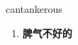 
\begin{frame}
{\huge cantankerous}
\begin{center}
\begin{enumerate}\Large
  \item \textbf{脾气不好的}
\end{enumerate}
\end{center}
\end{frame}

